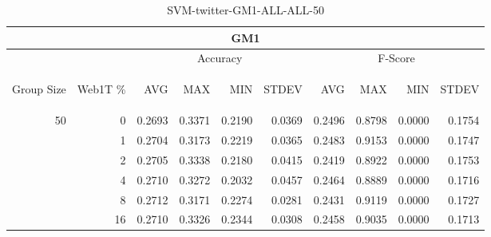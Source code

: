 \begin{center}
\begin{table}[htbp] 
 \begin{center}
\begin{tabular}{ | r | r | r | r | r | r | r | r | r | r |}
\hline
\multicolumn{10}{|c|}{GM1}\\
\hline
 & & \multicolumn{4}{|c|}{Accuracy} & \multicolumn{4}{|c|}{F-Score}\\ \cline{3-10}
\begin{sideways}Group Size\end{sideways} & \begin{sideways}Web1T \%\end{sideways} & \begin{sideways}AVG\end{sideways} & \begin{sideways}MAX\end{sideways} & \begin{sideways}MIN\end{sideways} & \begin{sideways}STDEV\end{sideways} & \begin{sideways}AVG\end{sideways} & \begin{sideways}MAX\end{sideways} & \begin{sideways}MIN\end{sideways} & \begin{sideways}STDEV\end{sideways}\\
\hline
\multirow{5}{*}{50}
 & 0 & 0.2693 & 0.3371 & 0.2190 & 0.0369 & 0.2496 & 0.8798 & 0.0000 & 0.1754\\ \cline{2-10}
 & 1 & 0.2704 & 0.3173 & 0.2219 & 0.0365 & 0.2483 & 0.9153 & 0.0000 & 0.1747\\ \cline{2-10}
 & 2 & 0.2705 & 0.3338 & 0.2180 & 0.0415 & 0.2419 & 0.8922 & 0.0000 & 0.1753\\ \cline{2-10}
 & 4 & 0.2710 & 0.3272 & 0.2032 & 0.0457 & 0.2464 & 0.8889 & 0.0000 & 0.1716\\ \cline{2-10}
 & 8 & 0.2712 & 0.3171 & 0.2274 & 0.0281 & 0.2431 & 0.9119 & 0.0000 & 0.1727\\ \cline{2-10}
 & 16 & 0.2710 & 0.3326 & 0.2344 & 0.0308 & 0.2458 & 0.9035 & 0.0000 & 0.1713\\ \cline{2-10}
\hline
\end{tabular}
\caption{SVM-twitter-GM1-ALL-ALL-50}
\label{table:SVM-twitter-GM1-ALL-ALL-50}
\end{center}
 \end{table}
\end{center}

